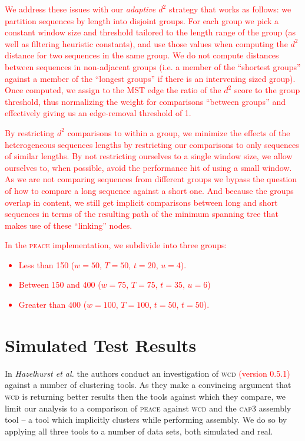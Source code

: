 \documentclass[a4paper,12pt]{article}
\newcommand{\mc}[1]{\textcolor{red}{#1}}
\begin{document}
\begin{appendix}
\mc{We address these issues with our {\it adaptive $d^2$} strategy that
works as follows: we partition sequences by length into disjoint groups.  For each
group we pick a constant window size and threshold tailored to the
length range of the group (as well as filtering heuristic constants),
and use those values when computing the $d^2$ distance for two
sequences in the same group.  We do not compute distances between
sequences in non-adjacent groups (i.e. a member of the ``shortest
groups'' against a member of the ``longest groups'' if there is an
intervening sized group).  Once computed, we assign to the MST
edge the ratio of the $d^2$ score to the group threshold, thus
normalizing the weight for comparisons ``between groups'' and
effectively giving us an edge-removal threshold of 1.}

\mc{By restricting $d^2$ comparisons to within a group, we minimize the
effects of the heterogeneous sequences lengths by restricting our
comparisons to only sequences of similar lengths.  By not restricting
ourselves to a single window size, we allow ourselves to, when possible, avoid the
performance hit of using a small window.  As we are not comparing
sequences from different groups we bypass the question of how to
compare a long sequence against a short one.  And because the
groups overlap in content, we still get implicit comparisons between
long and short sequences in terms of the resulting path of the minimum
spanning tree that makes use of these ``linking'' nodes.}

\mc{In the \textsc{peace} implementation, we subdivide into three groups:
\begin{itemize}
\item Less than 150 ($w=50$, $T=50$, $t=20$, $u=4$).
\item Between 150 and 400 ($w=75$, $T=75$, $t=35$, $u=6$)
\item Greater than 400 ($w=100$, $T=100$, $t=50$, $t=50$).
\end{itemize}}




\section{Simulated Test Results}

In {\it Hazelhurst et al.} \cite{Hazelhurst08a} the authors conduct
an investigation of \textsc{wcd} \mc{(version 0.5.1)} against a number of clustering
tools.  As they make a convincing argument that \textsc{wcd} is returning
better results then the tools against which they compare, we limit our
analysis to a comparison of \textsc{peace} against \textsc{wcd} and the \textsc{cap3} assembly
tool \cite{Huang99} -- a tool which implicitly clusters while
performing assembly.  We do so by applying all three tools to a number
of data sets, both simulated and real.


\end{appendix}
\end{document}
